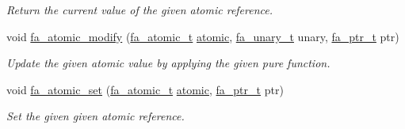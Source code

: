 \begin{DoxyCompactItemize}
\begin{DoxyCompactList}\small\item\em Return the current value of the given atomic reference. \end{DoxyCompactList}\item 
void \hyperlink{group___fa_atomic_ga4bc5dbae5b252ac051f62e693f6def76}{fa\-\_\-atomic\-\_\-modify} (\hyperlink{group___fa_atomic_gaa3c9a8cdc36169052d96fa152e2eb9ae}{fa\-\_\-atomic\-\_\-t} \hyperlink{util_8h_a5181e62dd55d17e3c1fd4ad40865f737}{atomic}, \hyperlink{group___fa_gaaafae8ab9ebae9019133108e56d2d4d1}{fa\-\_\-unary\-\_\-t} unary, \hyperlink{group___fa_ga915ddeae99ad7568b273d2b876425197}{fa\-\_\-ptr\-\_\-t} ptr)
\begin{DoxyCompactList}\small\item\em Update the given atomic value by applying the given pure function. \end{DoxyCompactList}\item 
void \hyperlink{group___fa_atomic_ga7730f096607dfd90b6af08d70fe1c9c7}{fa\-\_\-atomic\-\_\-set} (\hyperlink{group___fa_atomic_gaa3c9a8cdc36169052d96fa152e2eb9ae}{fa\-\_\-atomic\-\_\-t} \hyperlink{util_8h_a5181e62dd55d17e3c1fd4ad40865f737}{atomic}, \hyperlink{group___fa_ga915ddeae99ad7568b273d2b876425197}{fa\-\_\-ptr\-\_\-t} ptr)
\begin{DoxyCompactList}\small\item\em Set the given given atomic reference. \end{DoxyCompactList}\end{DoxyCompactItemize}


